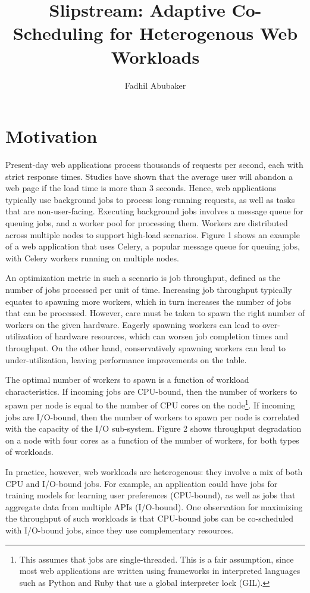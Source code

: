 \documentclass{proc}
\title{Slipstream: Adaptive Co-Scheduling for Heterogenous Web Workloads}
\author{Fadhil Abubaker}
\date{}
\begin{document}
\maketitle

\section{Motivation}

Present-day web applications process thousands of requests per second, each with
strict response times. Studies have shown that the average user will abandon a
web page if the load time is more than 3 seconds. Hence, web applications
typically use background jobs to process long-running requests, as well as tasks
that are non-user-facing. Executing background jobs involves a message queue for
queuing jobs, and a worker pool for processing them. Workers are distributed
across multiple nodes to support high-load scenarios. Figure 1 shows an example
of a web application that uses Celery, a popular message queue for queuing jobs,
with Celery workers running on multiple nodes.

An optimization metric in such a scenario is job throughput, defined as the
number of jobs processed per unit of time. Increasing job throughput typically
equates to spawning more workers, which in turn increases the number of jobs
that can be processed. However, care must be taken to spawn the right number of
workers on the given hardware. Eagerly spawning workers can lead to
over-utilization of hardware resources, which can worsen job completion times
and throughput. On the other hand, conservatively spawning workers can lead to
under-utilization, leaving performance improvements on the table.

The optimal number of workers to spawn is a function of workload
characteristics. If incoming jobs are CPU-bound, then the number of workers to
spawn per node is equal to the number of CPU cores on the node\footnote{This
assumes that jobs are single-threaded. This is a fair assumption, since most web
applications are written using frameworks in interpreted languages such as
Python and Ruby that use a global interpreter lock (GIL).}. If incoming jobs are
I/O-bound, then the number of workers to spawn per node is correlated with the
capacity of the I/O sub-system. Figure 2 shows throughput degradation on a node
with four cores as a function of the number of workers, for both types of
workloads.

In practice, however, web workloads are heterogenous: they involve a mix of both
CPU and I/O-bound jobs. For example, an application could have jobs for training
models for learning user preferences (CPU-bound), as well as jobs that aggregate
data from multiple APIs (I/O-bound). One observation for maximizing the
throughput of such workloads is that CPU-bound jobs can be co-scheduled with
I/O-bound jobs, since they use complementary resources.
\end{document}
